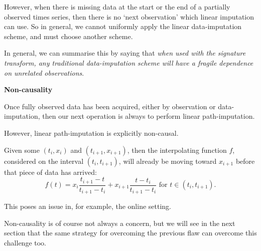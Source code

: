 \documentclass{article}
\renewcommand{\subsubsection}[1]{\textbf{#1}

} %
\begin{document}

However, when there is missing data at the start or the end of a partially observed times series, then there is no `next observation' which linear imputation can use. So in general, we cannot uniformly apply the linear data-imputation scheme, and must choose another scheme.

In general, we can summarise this by saying that \emph{when used with the signature transform, any traditional data-imputation scheme will have a fragile dependence on unrelated observations}.

\subsubsection{Non-causality}
Once fully observed data has been acquired, either by observation or data-imputation, then our next operation is always to perform linear path-imputation.

However, linear path-imputation is explicitly non-causal.

Given some $(t_i, x_i)$ and $(t_{i+1}, x_{i + 1})$, then the interpolating function $f$, considered on the interval $(t_i, t_{i + 1})$, will already be moving toward $x_{i + 1}$ before that piece of data has arrived:
\begin{equation*}
    f(t) = x_{i} \frac{t_{i + 1} - t}{t_{i + 1} - t_i} + x_{i + 1} \frac{t - t_i}{t_{i + 1} - t_i}\text{ for }t \in (t_i, t_{i + 1}).
\end{equation*}

This poses an issue in, for example, the online setting.

Non-causality is of course not always a concern, but we will see in the next section that the same strategy for overcoming the previous flaw can overcome this challenge too.
\end{document}
